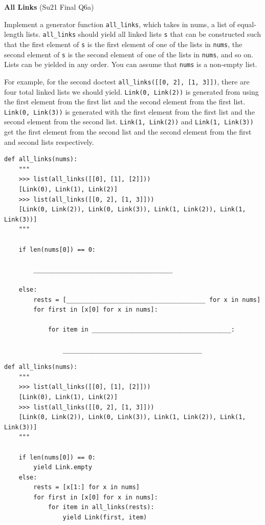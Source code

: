 \documentclass{exam}
\newlength{\currentparskip}
\newenvironment{blocksection}
{
    \setlength{\currentparskip}{\parskip}%
    \begin{minipage}{\linewidth}
    \setlength{\parskip}{\currentparskip}%
}
{
    \end{minipage}
}
\begin{document}
\begin{questions}
\begin{blocksection}
\question \textbf{All Links} (Su21 Final Q6a)

    Implement a generator function \lstinline{all_links}, which takes in nums, a list of equal-length lists. \lstinline{all_links} should yield all linked lists \lstinline{s} that can be constructed such that the first element of \lstinline{s} is the first element of one of the lists in \lstinline{nums}, the second element of \lstinline{s} is the second element of one of the lists in \lstinline{nums}, and so on. Lists can be yielded in any order. You can assume that \lstinline{nums} is a non-empty list.
    
    For example, for the second doctest \lstinline{all_links([[0, 2], [1, 3]])}, there are four total linked lists we should yield. \lstinline{Link(0, Link(2))} is generated from using the first element from the first list and the second element from the first list. \lstinline{Link(0, Link(3))} is generated with the first element from the first list and the second element from the second list. \lstinline{Link(1, Link(2))} and \lstinline{Link(1, Link(3))} get the first element from the second list and the second element from the first and second lists respectively.
\begin{lstlisting}
def all_links(nums):
    """
    >>> list(all_links([[0], [1], [2]]))
    [Link(0), Link(1), Link(2)]
    >>> list(all_links([[0, 2], [1, 3]]))
    [Link(0, Link(2)), Link(0, Link(3)), Link(1, Link(2)), Link(1, Link(3))]
    """
    
    if len(nums[0]) == 0:

        ______________________________________

    else:
        rests = [______________________________________ for x in nums]
        for first in [x[0] for x in nums]:

            for item in ______________________________________:

                ______________________________________
\end{lstlisting}
\end{blocksection}
\begin{solution}
\begin{lstlisting}
def all_links(nums):
    """
    >>> list(all_links([[0], [1], [2]]))
    [Link(0), Link(1), Link(2)]
    >>> list(all_links([[0, 2], [1, 3]]))
    [Link(0, Link(2)), Link(0, Link(3)), Link(1, Link(2)), Link(1, Link(3))]
    """
        
    if len(nums[0]) == 0:
        yield Link.empty
    else:
        rests = [x[1:] for x in nums]
        for first in [x[0] for x in nums]:
            for item in all_links(rests):
                yield Link(first, item)
\end{lstlisting}
\end{solution}
\end{questions}
\end{document}
